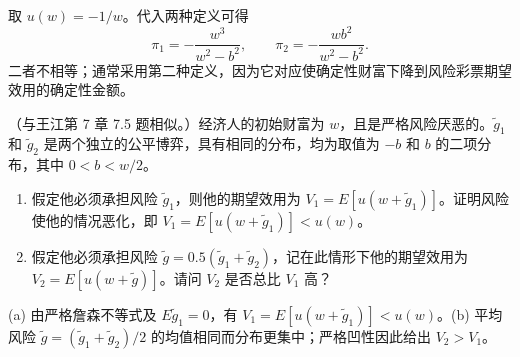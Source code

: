\begin{solution}
取 $u(w)=-1/w$。代入两种定义可得
\[
\pi_1=-\frac{w^3}{w^2-b^2},\qquad \pi_2=-\frac{wb^2}{w^2-b^2}.
\]
二者不相等；通常采用第二种定义，因为它对应使确定性财富下降到风险彩票期望效用的确定性金额。
\end{solution}
\begin{problem}
（与王江第 7 章 7.5 题相似。）经济人的初始财富为 $w$，且是严格风险厌恶的。$\tilde{g}_1$ 和 $\tilde{g}_2$ 是两个独立的公平博弈，具有相同的分布，均为取值为 $-b$ 和 $b$ 的二项分布，其中 $0<b<w/2$。
\begin{enumerate}[label=(\alph*)]
    \item 假定他必须承担风险 $\tilde{g}_1$，则他的期望效用为 $V_1=E[u(w+\tilde{g}_1)]$。证明风险使他的情况恶化，即 $V_1=E[u(w+\tilde{g}_1)]<u(w)$。
    \item 假定他必须承担风险 $\tilde{g}=0.5(\tilde{g}_1+\tilde{g}_2)$，记在此情形下他的期望效用为 $V_2=E[u(w+\tilde{g})]$。请问 $V_2$ 是否总比 $V_1$ 高？
\end{enumerate}
\end{problem}
\begin{solution}
(a) 由严格詹森不等式及 $E\tilde g_1=0$，有 $V_1=E[u(w+\tilde g_1)]<u(w)$。(b) 平均风险 $\tilde g=(\tilde g_1+\tilde g_2)/2$ 的均值相同而分布更集中；严格凹性因此给出 $V_2>V_1$。
\end{solution}
